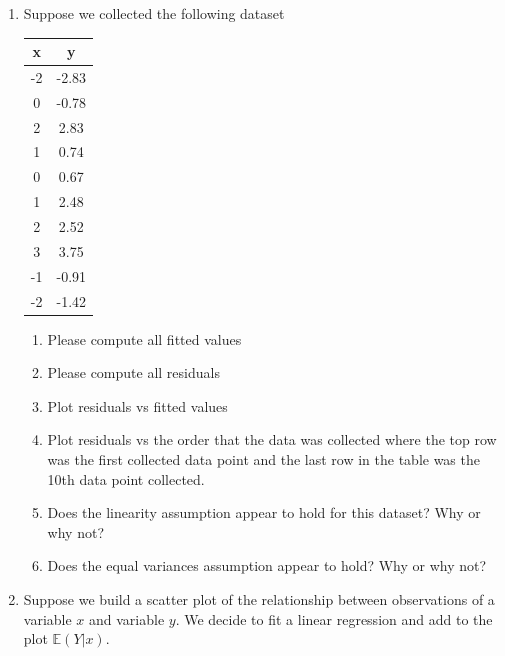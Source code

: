 \begin{enumerate}
    \item Suppose we collected the following dataset
    \begin{table}[ht!]
        \centering
        \begin{tabular}{c|c}
            x & y \\
            \hline
            -2  & -2.83  \\ 
            0   &  -0.78 \\ 
            2   &  2.83  \\ 
            1   &  0.74  \\ 
            0   &  0.67  \\ 
            1   &  2.48  \\ 
            2   &  2.52  \\ 
            3   &  3.75  \\ 
            -1  &  -0.91 \\ 
            -2  &  -1.42 \\ 
        \end{tabular}
    \end{table}
    \begin{enumerate}
        \item Please compute all fitted values
        \item Please compute all residuals
        \item Plot residuals vs fitted values
        \item Plot residuals vs the order that the data was collected where the top row was the first collected data point and the last row in the table was the 10th data point collected. 
        \item Does the linearity assumption appear to hold for this dataset? Why or why not?
        \item Does the equal variances assumption appear to hold? Why or why not?
    \end{enumerate}
    
    
    
    \item Suppose we build a scatter plot of the relationship between observations of a variable $x$ and variable $y$. 
    We decide to fit a linear regression and add to the plot $\mathbb{E}(Y|x)$. 
    

\end{enumerate}
